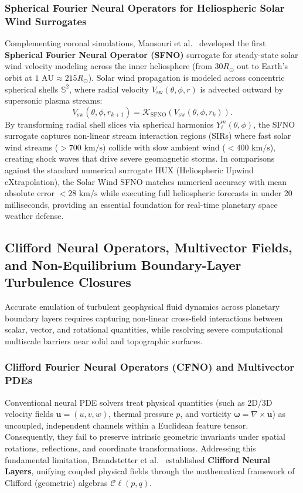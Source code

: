 \subsubsection{Spherical Fourier Neural Operators for Heliospheric Solar Wind Surrogates}
Complementing coronal simulations, Mansouri et al.~\cite{mansouri2025solarwind} developed the first \textbf{Spherical Fourier Neural Operator (SFNO)} surrogate for steady-state solar wind velocity modeling across the inner heliosphere (from $30 R_\odot$ out to Earth's orbit at $1\text{ AU} \approx 215 R_\odot$). Solar wind propagation is modeled across concentric spherical shells $\mathbb{S}^2$, where radial velocity $V_{\text{sw}}(\theta, \phi, r)$ is advected outward by supersonic plasma streams:
\begin{equation}
    V_{\text{sw}}(\theta, \phi, r_{k+1}) = \mathcal{K}_{\text{SFNO}} \left( V_{\text{sw}}(\theta, \phi, r_k) \right).
\end{equation}
By transforming radial shell slices via spherical harmonics $Y_\ell^m(\theta, \phi)$, the SFNO surrogate captures non-linear stream interaction regions (SIRs) where fast solar wind streams ($> 700\text{ km/s}$) collide with slow ambient wind ($< 400\text{ km/s}$), creating shock waves that drive severe geomagnetic storms. In comparisons against the standard numerical surrogate HUX (Heliospheric Upwind eXtrapolation), the Solar Wind SFNO matches numerical accuracy with mean absolute error $< 28\text{ km/s}$ while executing full heliospheric forecasts in under 20 milliseconds, providing an essential foundation for real-time planetary space weather defense.

\subsection{Clifford Neural Operators, Multivector Fields, and Non-Equilibrium Boundary-Layer Turbulence Closures}
\label{sec:clifford_and_wmles}

Accurate emulation of turbulent geophysical fluid dynamics across planetary boundary layers requires capturing non-linear cross-field interactions between scalar, vector, and rotational quantities, while resolving severe computational multiscale barriers near solid and topographic surfaces.

\subsubsection{Clifford Fourier Neural Operators (CFNO) and Multivector PDEs}
Conventional neural PDE solvers treat physical quantities (such as 2D/3D velocity fields $\mathbf{u} = (u, v, w)$, thermal pressure $p$, and vorticity $\boldsymbol{\omega} = \nabla \times \mathbf{u}$) as uncoupled, independent channels within a Euclidean feature tensor. Consequently, they fail to preserve intrinsic geometric invariants under spatial rotations, reflections, and coordinate transformations. Addressing this fundamental limitation, Brandstetter et al.~\cite{brandstetter2023clifford} established \textbf{Clifford Neural Layers}, unifying coupled physical fields through the mathematical framework of Clifford (geometric) algebras $\mathcal{C}\ell(p, q)$.

